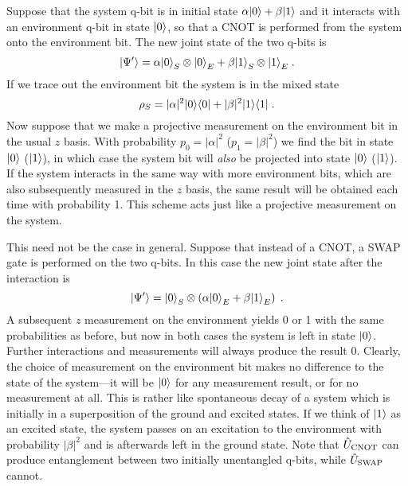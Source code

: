 Suppose that the system q-bit is in initial
state $\alpha{| 0 \rangle}+\beta{| 1 \rangle}$ and it
interacts with an environment q-bit in state ${| 0 \rangle}$, so that
a CNOT is performed from the system onto
the environment bit.  The new joint state of the two q-bits is
\begin{equation}
{| \Psi' \rangle} = \alpha{| 0 \rangle}_S\otimes{| 0 \rangle}_E
  + \beta{| 1 \rangle}_S\otimes{| 1 \rangle}_E \;.
\end{equation}
If we trace out the environment bit the system is in the mixed state
\begin{equation}
\rho_S = |\alpha|^2 {| 0 \rangle}{\langle 0 |} + |\beta|^2 {| 1 \rangle}{\langle 1 |} \;.
\end{equation}
Now suppose that we make a projective measurement on the environment bit
in the usual $z$ basis.  With probability $p_0 = |\alpha|^2$
($p_1 = |\beta|^2$) we find the bit in state ${| 0 \rangle}$ (${| 1 \rangle}$), in which
case the system bit will {\it also} be projected into state
${| 0 \rangle}$ (${| 1 \rangle}$).  If the system interacts in the same way with more
environment bits, which are also subsequently measured in the $z$ basis,
the same result will be obtained each time with probability 1.  This
scheme acts just like a projective measurement on the system.

This need not be the case in general.  Suppose that instead of a CNOT,
a SWAP gate is performed on the two q-bits.  In this case the new joint
state after the interaction is
\begin{equation}
{| \Psi' \rangle} = {| 0 \rangle}_S \otimes
  \left( \alpha{| 0 \rangle}_E + \beta{| 1 \rangle}_E \right) \;.
\end{equation}
A subsequent $z$ measurement on the environment yields 0 or 1 with the
same probabilities as before, but now in both cases the system is left
in state ${| 0 \rangle}$.  Further interactions and measurements will always
produce the result 0.  Clearly, the choice of measurement on the environment
bit makes no difference to the state of the system---it will be ${| 0 \rangle}$
for any measurement result, or for no measurement at all.  This is rather
like spontaneous decay of a system which is initially in a superposition
of the ground and excited states.  If we think of ${| 1 \rangle}$ as an excited
state, the system passes on an excitation to the environment with probability
$|\beta|^2$ and is afterwards left in the ground state.
Note that ${\hat U}_{\rm CNOT}$ can produce entanglement between two
initially unentangled q-bits, while ${\hat U}_{\rm SWAP}$ cannot.

